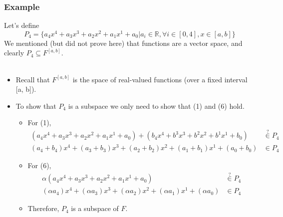 \documentclass[10pt]{article}
\begin{document}
\subsubsection*{Example}
Let's define
\[P_4 = \{a_4 x^4 + a_3 x^3 + a_2 x^2 + a_1 x^1 + a_0 | a_i \in \mathbb{R}, \forall i \in [0, 4], x \in [a, b]\}\]
We mentioned (but did not prove here) that functions are a vector space, and clearly $P_4 \subseteq F^{[a, b]}$.\\\\
\begin{itemize}
	\item Recall that $F^{[a, b]}$ is the space of real-valued functions (over a fixed interval [a, b]).
	\item To show that $P_4$ is a subspace we only need to show that (1) and (6) hold.
	\begin{itemize}
	    \item For (1),
        \begin{align*}
            (a_4 x^4 + a_3 x^3 + a_2 x^2 + a_1 x^1 + a_0) + (b_4 x^4 + b^3 x^3 + b^2 x^2 + b^1 x^1 + b_0) &\stackrel{?}{\in} P_4 \\
            (a_4 + b_4) x^4 + (a_3 + b_3) x^3 + (a_2 + b_2) x^2 + (a_1 + b_1) x^1 + (a_0 + b_0) &\in P_4 
        \end{align*}
        \item For (6),
        \begin{align*}
            \alpha(a_4 x^4 + a_3 x^3 + a_2 x^2 + a_1 x^1 + a_0) &\stackrel{?}{\in} P_4 \\
            (\alpha a_4) x^4 + (\alpha a_3) x^3 + (\alpha a_2) x^2 + (\alpha a_1) x^1 + (\alpha a_0) &\in P_4
        \end{align*}
        \item Therefore, $P_4$ is a subspace of $F$.
    \end{itemize}
\end{itemize}
\end{document}

